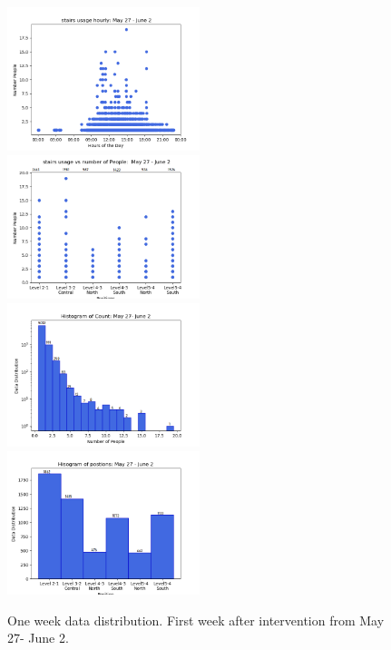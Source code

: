 \begin{figure}[!h]
    \centering
      \includegraphics[width=0.5\textwidth]{image/Chapters/Chapter6/oneWeekAfterhourly.png}\hfill
    \includegraphics[width=0.5\textwidth]{image/Chapters/Chapter6/PositionCountOneWeekAfter.png}\hfill
    \includegraphics[width=0.5\textwidth]{image/Chapters/Chapter6/oneweekCountDistributonAfter.png}\hfill 
    \includegraphics[width=0.5\textwidth]{image/Chapters/Chapter6/oneweekafterPositionDistributon.png}
    \caption{One week data distribution. First week after intervention from May 27- June 2.}
    \label{55}
\end{figure}





